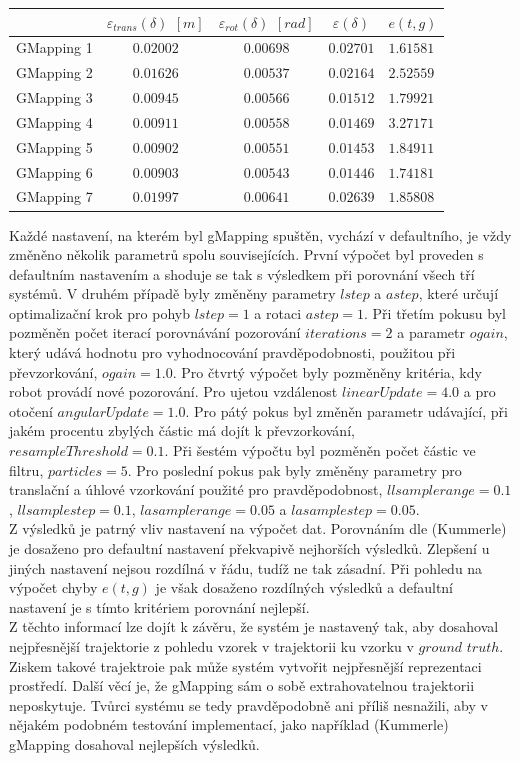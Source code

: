 \documentclass[12pt]{article}
\begin{document}
\begin{center}
	\begin{tabular}{c|cccp{3cm}}
		\bfseries \bfseries  & $\varepsilon_{trans}(\delta)$ $[m]$ & $\varepsilon_{rot}(\delta)$ $[rad]$ & $\varepsilon(\delta)$ & $e(t,g)$ \\ [2mm]
		\hline
		GMapping 1 & $0.02002$ & $0.00698$ & $0.02701$ & $1.61581$\\
		GMapping 2 & $0.01626$ & $0.00537$ & $0.02164$ & $2.52559$\\ 
		GMapping 3 & $0.00945$ & $0.00566$ & $0.01512$ & $1.79921$\\ 
		GMapping 4 & $0.00911$ & $0.00558$ & $0.01469$ & $3.27171$\\ 
		GMapping 5 & $0.00902$ & $0.00551$ & $0.01453$ & $1.84911$\\ 
		GMapping 6 & $0.00903$ & $0.00543$ & $0.01446$ & $1.74181$\\ 
		GMapping 7 & $0.01997$ & $0.00641$ & $0.02639$ & $1.85808$\\ 
	\end{tabular}
\end{center}

Každé nastavení, na kterém byl gMapping spuštěn, vychází v defaultního, je vždy změněno několik parametrů spolu souvisejících. První výpočet byl proveden s defaultním nastavením a shoduje se tak s výsledkem při porovnání všech tří systémů. V druhém případě byly změněny parametry $lstep$ a $astep$, které určují optimalizační krok pro pohyb $lstep=1$ a rotaci $astep=1$. Při třetím pokusu byl pozměněn počet iterací porovnávání pozorování $iterations=2$ a parametr $ogain$, který udává hodnotu pro vyhodnocování pravděpodobnosti, použitou při převzorkování, $ogain=1.0$. Pro čtvrtý výpočet byly pozměněny kritéria, kdy robot provádí nové pozorování. Pro ujetou vzdálenost $linearUpdate=4.0$ a pro otočení $angularUpdate=1.0$. Pro pátý pokus byl změněn parametr udávající, při jakém procentu zbylých částic má dojít k převzorkování, $resampleThreshold=0.1$. Při šestém výpočtu byl pozměněn počet částic ve filtru, $particles=5$. Pro poslední pokus pak byly změněny parametry pro translační a úhlové vzorkování použité pro pravděpodobnost, $llsamplerange=0.1$, $llsamplestep=0.1$, $lasamplerange=0.05$ a $lasamplestep=0.05$.\\
\indent Z výsledků je patrný vliv nastavení na výpočet dat. Porovnáním dle (Kummerle) je dosaženo pro defaultní nastavení překvapivě nejhorších výsledků. Zlepšení u jiných nastavení nejsou rozdílná v řádu, tudíž ne tak zásadní. Při pohledu na výpočet chyby $e(t,g)$ je však dosaženo rozdílných výsledků a defaultní nastavení je s tímto kritériem porovnání nejlepší.\\
\indent Z těchto informací lze dojít k závěru, že systém je nastavený tak, aby dosahoval nejpřesnější trajektorie z pohledu vzorek v trajektorii ku vzorku v $ground$ $truth$. Ziskem takové trajektroie pak může systém vytvořit nejpřesnější reprezentaci prostředí. Další věcí je, že gMapping sám o sobě extrahovatelnou trajektorii neposkytuje. Tvůrci systému se tedy pravděpodobně ani příliš nesnažili, aby v nějakém podobném testování implementací, jako například (Kummerle) gMapping dosahoval nejlepších výsledků. 
\end{document}
